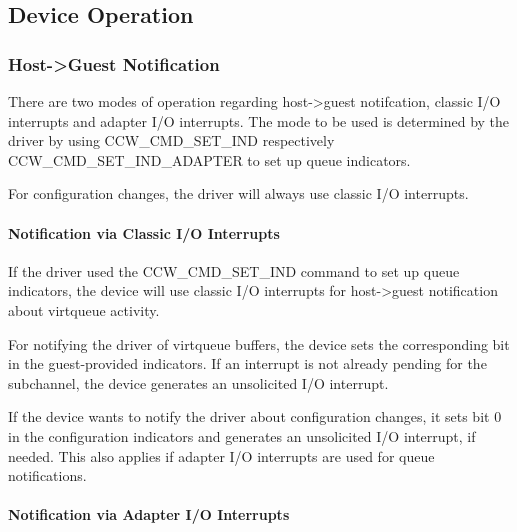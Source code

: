 \subsection{Device Operation}\label{sec:Virtio Transport Options / Virtio over channel I/O / Device Operation}

\subsubsection{Host->Guest Notification}\label{sec:Virtio Transport Options / Virtio over channel I/O / Device Operation / Host->Guest Notification}

There are two modes of operation regarding host->guest notifcation,
classic I/O interrupts and adapter I/O interrupts. The mode to be
used is determined by the driver by using CCW_CMD_SET_IND respectively
CCW_CMD_SET_IND_ADAPTER to set up queue indicators.

For configuration changes, the driver will always use classic I/O
interrupts.

\paragraph{Notification via Classic I/O Interrupts}\label{sec:Virtio Transport Options / Virtio over channel I/O / Device Operation / Host->Guest Notification / Notification via Classic I/O Interrupts}

If the driver used the CCW_CMD_SET_IND command to set up queue
indicators, the device will use classic I/O interrupts for
host->guest notification about virtqueue activity.

For notifying the driver of virtqueue buffers, the device sets the
corresponding bit in the guest-provided indicators. If an
interrupt is not already pending for the subchannel, the device
generates an unsolicited I/O interrupt.

If the device wants to notify the driver about configuration
changes, it sets bit 0 in the configuration indicators and
generates an unsolicited I/O interrupt, if needed. This also
applies if adapter I/O interrupts are used for queue notifications.

\paragraph{Notification via Adapter I/O Interrupts}\label{sec:Virtio Transport Options / Virtio over channel I/O / Device Operation / Host->Guest Notification / Notification via Adapter I/O Interrupts}

